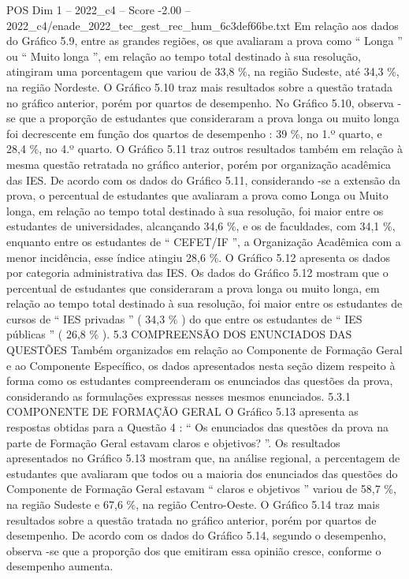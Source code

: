 \begin{textsample}{POS Dim 1 – 2022\_c4 – Score -2.00 – 2022\_c4/enade\_2022\_tec\_gest\_rec\_hum\_6c3def66be.txt}
Em relação aos dados do Gráfico 5.9, entre as grandes regiões, os que avaliaram a prova como “ Longa ” ou “ Muito longa ”, em relação ao tempo total destinado à sua resolução, atingiram uma porcentagem que variou de 33,8 \%, na região Sudeste, até 34,3 \%, na região Nordeste.
O Gráfico 5.10 traz mais resultados sobre a questão tratada no gráfico anterior, porém por quartos de desempenho.
No Gráfico 5.10, observa -se que a proporção de estudantes que consideraram a prova longa ou muito longa foi decrescente em função dos quartos de desempenho : 39 \%, no 1.º quarto, e 28,4 \%, no 4.º quarto.
O Gráfico 5.11 traz outros resultados também em relação à mesma questão retratada no gráfico anterior, porém por organização acadêmica das IES.
De acordo com os dados do Gráfico 5.11, considerando -se a extensão da prova, o percentual de estudantes que avaliaram a prova como Longa ou Muito longa, em relação ao tempo total destinado à sua resolução, foi maior entre os estudantes de universidades, alcançando 34,6 \%, e os de faculdades, com 34,1 \%, enquanto entre os estudantes de “ CEFET/IF ”, a Organização Acadêmica com a menor incidência, esse índice atingiu 28,6 \%.
O Gráfico 5.12 apresenta os dados por categoria administrativa das IES.
Os dados do Gráfico 5.12 mostram que o percentual de estudantes que consideraram a prova longa ou muito longa, em relação ao tempo total destinado à sua resolução, foi maior entre os estudantes de cursos de “ IES privadas ” ( 34,3 \% ) do que entre os estudantes de “ IES públicas ” ( 26,8 \% ). 5.3 COMPREENSÃO DOS ENUNCIADOS DAS QUESTÕES Também organizados em relação ao Componente de Formação Geral e ao Componente Específico, os dados apresentados nesta seção dizem respeito à forma como os estudantes compreenderam os enunciados das questões da prova, considerando as formulações expressas nesses mesmos enunciados. 5.3.1 COMPONENTE DE FORMAÇÃO GERAL O Gráfico 5.13 apresenta as respostas obtidas para a Questão 4 : “ Os enunciados das questões da prova na parte de Formação Geral estavam claros e objetivos? ”.
Os resultados apresentados no Gráfico 5.13 mostram que, na análise regional, a percentagem de estudantes que avaliaram que todos ou a maioria dos enunciados das questões do Componente de Formação Geral estavam “ claros e objetivos ” variou de 58,7 \%, na região Sudeste e 67,6 \%, na região Centro-Oeste.
O Gráfico 5.14 traz mais resultados sobre a questão tratada no gráfico anterior, porém por quartos de desempenho.
De acordo com os dados do Gráfico 5.14, segundo o desempenho, observa -se que a proporção dos que emitiram essa opinião cresce, conforme o desempenho aumenta.

\end{textsample}
